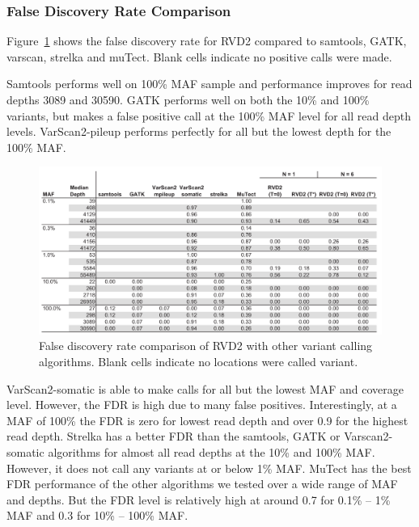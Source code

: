 \documentclass[11pt,reqno]{amsart}
\begin{document}
\subsubsection*{False Discovery Rate Comparison}
Figure~\ref{tbl:comparison_fdr} shows the false discovery rate for RVD2 compared to samtools, GATK, varscan, strelka and muTect. Blank cells indicate no positive calls were made.

Samtools performs well on 100\% MAF sample and performance improves for read depths 3089 and 30590. GATK performs well on both the 10\% and 100\% variants, but makes a false positive call at the 100\% MAF level for all read depth levels. VarScan2-pileup performs perfectly for all but the lowest depth for the 100\% MAF.

\begin{figure}[h]
\begin{center}
\includegraphics[width=160mm]{pdf_figs/comparison_table_fdr.pdf}
\caption{False discovery rate comparison of RVD2 with other variant calling algorithms. Blank cells indicate no locations were called variant.}
\label{tbl:comparison_fdr}
\end{center}
\end{figure}

VarScan2-somatic is able to make calls for all but the lowest MAF and coverage level. However, the FDR is high due to many false positives. Interestingly, at a MAF of 100\% the FDR is zero for lowest read depth and over 0.9 for the highest read depth. Strelka has a better FDR than the samtools, GATK or Varscan2-somatic algorithms for almost all read depths at the 10\% and 100\% MAF. However, it does not call any variants at or below 1\% MAF.  MuTect has the best FDR performance of the other algorithms we tested over a wide range of MAF and depths. But the FDR level is relatively high at around 0.7 for 0.1\% -- 1\% MAF and 0.3 for 10\% -- 100\% MAF.
 
\end{document}

